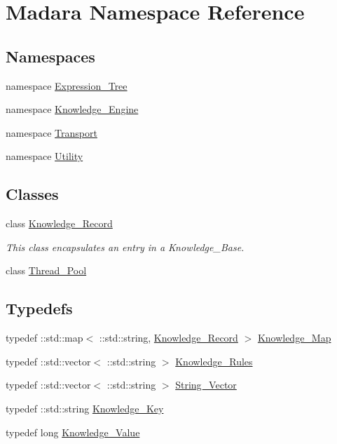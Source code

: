 \hypertarget{namespaceMadara}{
\section{Madara Namespace Reference}
\label{d8/da1/namespaceMadara}
}
\subsection*{Namespaces}
\begin{DoxyCompactItemize}
\item 
namespace \hyperlink{namespaceMadara_1_1Expression__Tree}{Expression\_\-Tree}
\item 
namespace \hyperlink{namespaceMadara_1_1Knowledge__Engine}{Knowledge\_\-Engine}
\item 
namespace \hyperlink{namespaceMadara_1_1Transport}{Transport}
\item 
namespace \hyperlink{namespaceMadara_1_1Utility}{Utility}
\end{DoxyCompactItemize}
\subsection*{Classes}
\begin{DoxyCompactItemize}
\item 
class \hyperlink{classMadara_1_1Knowledge__Record}{Knowledge\_\-Record}
\begin{DoxyCompactList}\small\item\em This class encapsulates an entry in a Knowledge\_\-Base. \item\end{DoxyCompactList}\item 
class \hyperlink{classMadara_1_1Thread__Pool}{Thread\_\-Pool}
\end{DoxyCompactItemize}
\subsection*{Typedefs}
\begin{DoxyCompactItemize}
\item 
typedef ::std::map$<$ ::std::string, \hyperlink{classMadara_1_1Knowledge__Record}{Knowledge\_\-Record} $>$ \hyperlink{namespaceMadara_a072a1733d5e97cad8e1564c37135a506}{Knowledge\_\-Map}
\item 
typedef ::std::vector$<$ ::std::string $>$ \hyperlink{namespaceMadara_a40d054dded9fdde46b83532c44c6ff96}{Knowledge\_\-Rules}
\item 
typedef ::std::vector$<$ ::std::string $>$ \hyperlink{namespaceMadara_a5555eaae3fdb02fcc2691b8ff0178e1c}{String\_\-Vector}
\item 
typedef ::std::string \hyperlink{namespaceMadara_a9e2183de30b1e287a420204e355007d6}{Knowledge\_\-Key}
\item 
typedef long \hyperlink{namespaceMadara_a56e2f4a683b068af25c2ffb47d9a825e}{Knowledge\_\-Value}
\end{DoxyCompactItemize}


